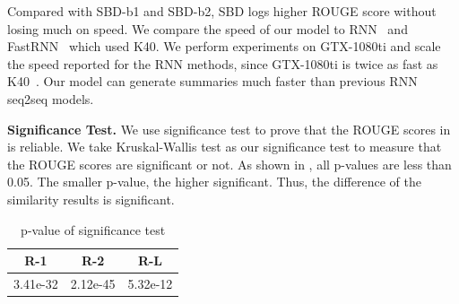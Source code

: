 Compared with SBD-b1 and SBD-b2,
SBD logs higher ROUGE score without losing much on speed. 
We compare the speed of our model to RNN~\cite{SeeLM17} and FastRNN~\cite{P18-1063}
which used K40. 
We perform experiments on GTX-1080ti and scale the speed 
reported for the RNN methods,
since GTX-1080ti is twice as fast as K40~\cite{gehring2017convs2s}.
Our model can 
generate summaries much faster than previous RNN seq2seq models.



\textbf{Significance Test.} We use significance test to prove that the ROUGE scores in  is reliable.
We take Kruskal-Wallis test \cite{loukina2014automatic,albert2017exploring} as our
significance test to measure that the ROUGE scores
are significant or not. As shown in , all p-values are less than 0.05. 
The smaller p-value, the higher significant.
Thus, the difference of the similarity results is significant. 

\begin{table}[th]
	\small
	\centering
	\begin{tabular}{|c|c|c|}
		\hline
		R-1 & R-2 & R-L \\ \hline
		3.41e-32 & 2.12e-45 & 5.32e-12  \\ 
		\hline
	\end{tabular}
	\caption{p-value of significance test}
	\label{tab:pvalue}
\end{table}

